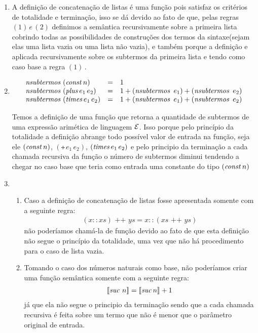 \begin{enumerate}
	  \item  A defini\c{c}\~ao de concatena\c{c}\~ao de listas \'e uma fun\c{c}\~ao pois satisfaz os crit\'erios de totalidade e termina\c{c}\~ao, isso se dá devido ao fato de que, pelas regras $(1) \, e \, (2)$ definimos a sem\^antica recursivamente sobre a primeira lista cobrindo todas as possibilidades de constru\c{c}\~oes dos termos da sintaxe(sejam elas uma lista vazia ou uma lista n\~ao vazia), e tamb\'em porque a defini\c{c}\~ao e aplicada recursivamente sobre os subtermos da primeira lista e tendo como caso base a regra $(1)$\,.

	  \item
	  \[
	  \begin{array}{lcl}
	  \textit{nsubtermos } (\textit{const\/}\, n)  & = & 1 \\
	  \textit{nsubtermos } (\textit{plus\/}\,e_1\,e_2) & = & 1 +
          (\textit{nsubtermos }\,e_1) + (\textit{nsubtermos }\,e_2) \\
	  \textit{nsubtermos }(\textit{times\/}\,e_1\,e_2) & = & 1
          + (\textit{nsubtermos }\,e_1) + (\textit{nsubtermos }\,e_2) \\
	  \end{array}
	  \]

	  Temos a definição de uma função que retorna a quantidade de subtermos de uma expressão arimética de linguagem $\mathcal{E}$. Isso porque pelo princípio da totalidade a definição abrange todo possível valor de entrada na função, seja ele $(\textit{const\/}\, n)$, $(\tplus\,e_1\,e_2)$, $(\textit{times\/}\,e_1\,e_2)$ e pelo principio da terminação a cada chamada recursiva da função o número de subtermos diminui tendendo a chegar no caso base que teria como entrada uma constante do tipo $(\textit{const\/}\, n)$


	  \item
	  \begin{enumerate}
	  \item Caso a definição de concatenação de listas fosse apresentada somente com a seguinte regra:
	  	  \[
	  	  \begin{array}{c}
	  	  	(x :: xs) \text{ ++ }  ys  =  x :: (xs\text{ ++ } ys)
	  	  \end{array}
	  	  \]
	  não poderíamos chamá-la de função devido ao fato de que esta definição não segue o princípio da totalidade, uma vez que não há procedimento para o caso de lista vazia.

	 \item Tomando o caso dos números naturais como base, não poderíamos criar uma função semântica somente com a seguinte regra:
	 	 \[
	 	 \begin{array}{c}
	 	 	\llbracket \textit{suc\/}\,\,n\rrbracket  =  \llbracket \textit{suc\/}\,n \rrbracket + 1
	 	\end{array}
	 	\]
	 já que ela não segue o principio da terminação sendo que a
         cada chamada recursiva é feita sobre um termo que não é menor
         que o parâmetro original de entrada.
	 \end{enumerate}

	\end{enumerate}

